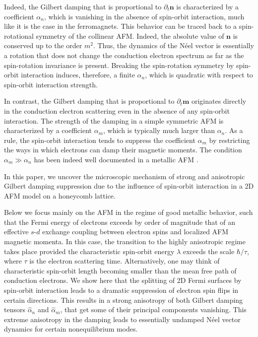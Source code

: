 \documentclass[%
  twocolumn,
  aps,
  prb,
  amsmath,
  amssymb,
  superscriptaddress,
  nofootinbib,
  floatfix
]{revtex4-1}
\newcommand{\bb}{\boldsymbol}
\newcommand{\0}{^{\phantom{\dagger}}}
\begin{document}
Indeed, the Gilbert damping that is proportional to $\partial_t\bb{n}$ is characterized by a coefficient $\alpha_n$, which is vanishing in the absence of spin-orbit interaction, much like it is the case in the ferromagnets. This behavior can be traced back to a spin-rotational symmetry of the collinear AFM. Indeed, the absolute value of $\bb{n}$ is conserved up to the order $m^2$. Thus, the dynamics of the N\'eel vector is essentially a rotation that does not change the conduction electron spectrum as far as the spin-rotation invariance is present. Breaking the spin-rotation symmetry by spin-orbit interaction induces, therefore, a finite $\alpha_n$, which is quadratic with respect to spin-orbit interaction strength.

In contrast, the Gilbert damping that is proportional to $\partial_t\bb{m}$ originates directly in the conduction electron scattering even in the absence of any spin-orbit interaction. The strength of the damping in a simple symmetric AFM is characterized by a coefficient $\alpha_m$, which is typically much larger than $\alpha_n$. As a rule, the spin-orbit interaction tends to suppress the coefficient $\alpha_m$ by restricting the ways in which electrons can damp their magnetic moments.  The condition $\alpha_m \gg \alpha_n$ has been indeed well documented in a metallic AFM \cite{PhysRevMaterials.1.061401, Mahfouzi2018a}. 

In this paper, we uncover the microscopic mechanism of strong and anisotropic Gilbert damping suppression due to the influence of spin-orbit interaction in a 2D AFM model on a honeycomb lattice. 

Below we focus mainly on the AFM in the regime of good metallic behavior, such that the Fermi energy of electrons exceeds by order of magnitude that of an effective $s$-$d$ exchange coupling between electron spins and localized AFM magnetic momenta.  In this case, the transition to the highly anisotropic regime takes place provided the characteristic spin-orbit energy $\lambda$ exceeds the scale $\hbar/\tau$, where $\tau$ is the electron scattering time. Alternatively, one may think of characteristic spin-orbit length becoming smaller than the mean free path of conduction electrons.  We show here that the splitting of 2D Fermi surfaces by spin-orbit interaction leads to a dramatic suppression of electron spin flips in certain directions. This results in a strong anisotropy of both Gilbert damping tensors $\hat{\alpha}_n$ and $\hat{\alpha}_m$, that get some of their principal components vanishing. This extreme anisotropy in the damping leads to essentially undamped N\'eel vector dynamics for certain nonequilibrium modes. 
\end{document}
